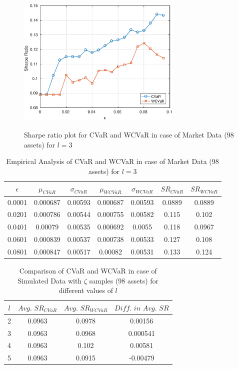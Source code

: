 \documentclass[12pt]{article}
\numberwithin{equation}{section}
\begin{document}
\begin{figure}[!h]
\centering
\includegraphics[height=7.0cm,width=0.7\textwidth]{CVaR/bse100_market/sr_cvar_3.eps}
\caption{Sharpe ratio plot for CVaR and WCVaR in case of Market Data (98 assets) for $l=3$}
\label{fig:6.4}
\end{figure}

\begin{table}[!h]
\centering
\captionsetup{justification=centering}
\begin{tabular}{||c|c|c|c|c|c|c||}
\hline
$\epsilon$ & $\mu_{CVaR}$ & $\sigma_{CVaR}$ & $\mu_{WCVaR}$ & $\sigma_{WCVaR}$ & $SR_{CVaR}$ & $SR_{WCVaR}$\\
\hline
0.0001 & 0.000687 & 0.00593 & 0.000687 & 0.00593 & 0.0889 & 0.0889 \\
0.0201 & 0.000786 & 0.00544 & 0.000755 & 0.00582 & 0.115 & 0.102 \\
0.0401 & 0.00079 & 0.00535 & 0.000692 & 0.0055 & 0.118 & 0.0967 \\
0.0601 & 0.000839 & 0.00537 & 0.000738 & 0.00533 & 0.127 & 0.108 \\
0.0801 & 0.000847 & 0.00517 & 0.00082 & 0.00531 & 0.133 & 0.124 \\
\hline
\end{tabular}
\caption{Empirical Analysis of CVaR and WCVaR in case of Market Data (98 assets) for $l=3$}
\label{tab:6.4}
\end{table}

\begin{table}[!h]
\centering
\captionsetup{justification=centering}
\begin{tabular}{||c|c|c|c||}
\hline
$l$ & $Avg. \, \, SR_{CVaR}$ & $Avg. \, \, SR_{WCVaR}$ & $Diff. \, \, in \, \, Avg. \, \, SR$ \\
\hline
2 & 0.0963 & 0.0978 & 0.00156 \\
3 & 0.0963 & 0.0968 & 0.000541 \\
4 & 0.0963 & 0.102 & 0.00581 \\
5 & 0.0963 & 0.0915 & -0.00479 \\
\hline
\end{tabular}
\caption{Comparison of CVaR and WCVaR in case of Simulated Data with $\zeta$ samples (98 assets) for different values of $l$}
\label{avgtab:6.5}
\end{table}
\end{document}
